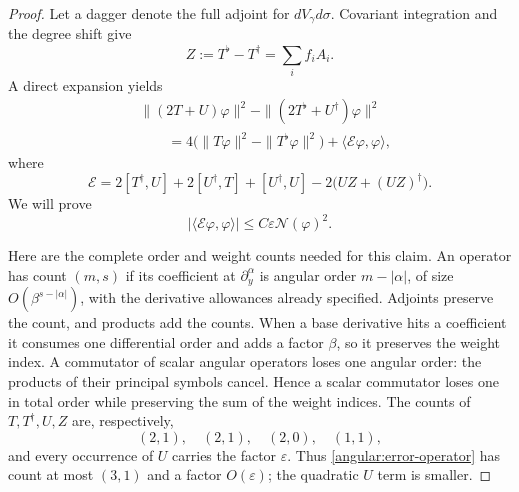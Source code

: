 \documentclass[11pt]{article}
\theoremstyle{definition}
\theoremstyle{remark}
\newcommand{\eps}{\varepsilon}
\numberwithin{equation}{section}
\begin{document}
\begin{proof}
Let a dagger denote the full adjoint for $dV_\gamma d\sigma$.
Covariant integration and the degree shift give
\begin{equation}\label{angular:Z-definition}
 Z:=T^\flat-T^\dagger=\sum_i f_iA_i.
\end{equation}
A direct expansion yields
\begin{equation}\label{angular:norm-comparison}
 \begin{split}
 &\|(2T+U)\varphi\|^2-
                \|(2T^\flat+U^\dagger)\varphi\|^2\\
 &\qquad=4\bigl(\|T\varphi\|^2-\|T^\flat\varphi\|^2\bigr)
                       +\langle\mathcal E\varphi,\varphi\rangle,
 \end{split}
\end{equation}
where
\begin{equation}\label{angular:error-operator}
 \mathcal E=2[T^\dagger,U]+2[U^\dagger,T]+[U^\dagger,U]
                       -2\bigl(UZ+(UZ)^\dagger\bigr).
\end{equation}
We will prove
\begin{equation}\label{angular:error-form-bound}
 |\langle\mathcal E\varphi,\varphi\rangle|
                         \le C\eps\mathcal N(\varphi)^2.
\end{equation}

Here are the complete order and weight counts needed for this claim.
An operator has count $(m,s)$ if its coefficient at $\partial_y^\alpha$
is angular order $m-|\alpha|$, of size $O(\beta^{s-|\alpha|})$,
with the derivative allowances already specified.
Adjoints preserve the count, and products add the counts.  When a base
derivative hits a coefficient it consumes one differential order and
adds a factor $\beta$, so it preserves the weight index.  A commutator
of scalar angular operators loses one angular order: the products of
their principal symbols cancel.  Hence a scalar commutator loses one in
total order while preserving the sum of the weight indices.
The counts of $T,T^\dagger,U,Z$ are, respectively,
\[
 (2,1),\quad(2,1),\quad(2,0),\quad(1,1),
\]
and every occurrence of $U$ carries the factor $\eps$.  Thus
\eqref{angular:error-operator} has count at most $(3,1)$ and a factor
$O(\eps)$; the quadratic $U$ term is smaller.


\end{proof}
\end{document}
